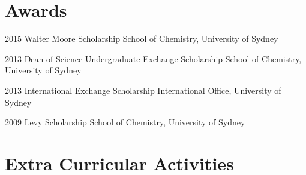 \documentclass[]{friggeri-cv} %
\begin{document}

\section{Awards}

\begin{entrylist}


\entry
{2015}
{Walter Moore Scholarship}
{School of Chemistry, University of Sydney}
{
}

\entry
{2013}
{Dean of Science Undergraduate Exchange Scholarship}
{School of Chemistry, University of Sydney}
{
}

\entry
{2013}
{International Exchange Scholarship}
{International Office, University of Sydney}
{
}

\entry
{2009}
{Levy Scholarship}
{School of Chemistry, University of Sydney}
{
}


\end{entrylist}


\section{Extra Curricular Activities}
\end{document}
